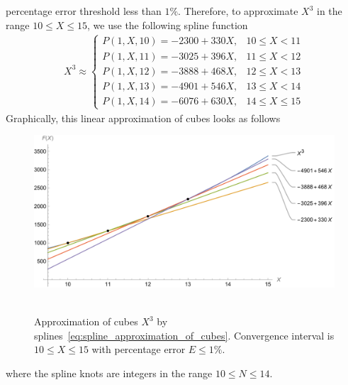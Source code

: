 percentage error threshold less than $1\%$.
Therefore, to approximate $X^3$ in the range $10 \leq X \leq 15$, we use the following spline function
\begin{align}
    X^3 \approx
    \begin{cases}
        P(1,X,10) = -2300 + 330X, & 10 \leq X < 11 \\
        P(1,X,11) = -3025 + 396X, & 11 \leq X < 12 \\
        P(1,X,12) = -3888 + 468X, & 12 \leq X < 13 \\
        P(1,X,13) = -4901 + 546X, & 13 \leq X < 14 \\
        P(1,X,14) = -6076 + 630X, & 14 \leq X \leq 15
    \end{cases}
    \label{eq:spline_approximation_of_cubes}
\end{align}
Graphically, this linear approximation of cubes looks as follows
\begin{figure}[H]
    \centering
    \includegraphics[width=1\textwidth]{sections/images/08_plots_of_cubes_power_with_p_2_10_15}
    ~\caption{
        Approximation of cubes $X^3$ by splines~\eqref{eq:spline_approximation_of_cubes}.
        Convergence interval is $10 \leq X \leq 15$ with percentage error $E\leq 1\%$.
    }
    \label{fig:08_plots_of_cubes_power_with_p_2_10_15}
\end{figure}
where the spline knots are integers in the range $10 \leq N \leq 14$.

